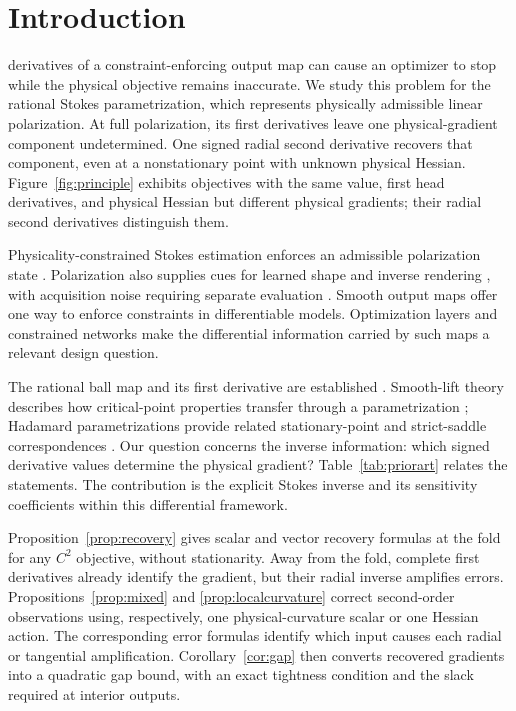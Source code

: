 \section{Introduction}
\label{sec:intro}
 derivatives of a constraint-enforcing output map can cause an optimizer to stop while the physical objective remains inaccurate. We study this problem for the rational Stokes parametrization, which represents physically admissible linear polarization. At full polarization, its first derivatives leave one physical-gradient component undetermined. One signed radial second derivative recovers that component, even at a nonstationary point with unknown physical Hessian. Figure~\ref{fig:principle} exhibits objectives with the same value, first head derivatives, and physical Hessian but different physical gradients; their radial second derivatives distinguish them.

Physicality-constrained Stokes estimation enforces an admissible polarization state \cite{hu,spc,psara}. Polarization also supplies cues for learned shape and inverse rendering \cite{ba,pandora}, with acquisition noise requiring separate evaluation \cite{polarns}. Smooth output maps offer one way to enforce constraints in differentiable models. Optimization layers \cite{optnet,cvxlayers} and constrained networks \cite{hardnet} make the differential information carried by such maps a relevant design question.

The rational ball map and its first derivative are established \cite[Sec.~V-B, (78)--(79)]{gcopter}. Smooth-lift theory describes how critical-point properties transfer through a parametrization \cite{lifts}; Hadamard parametrizations provide related stationary-point and strict-saddle correspondences \cite{hadamard}. Our question concerns the inverse information: which signed derivative values determine the physical gradient? Table~\ref{tab:priorart} relates the statements. The contribution is the explicit Stokes inverse and its sensitivity coefficients within this differential framework.

Proposition~\ref{prop:recovery} gives scalar and vector recovery formulas at the fold for any $C^2$ objective, without stationarity. Away from the fold, complete first derivatives already identify the gradient, but their radial inverse amplifies errors. Propositions~\ref{prop:mixed} and \ref{prop:localcurvature} correct second-order observations using, respectively, one physical-curvature scalar or one Hessian action. The corresponding error formulas identify which input causes each radial or tangential amplification. Corollary~\ref{cor:gap} then converts recovered gradients into a quadratic gap bound, with an exact tightness condition and the slack required at interior outputs.

